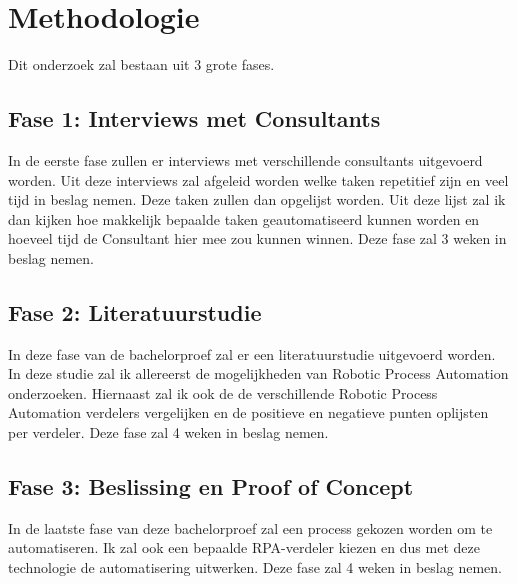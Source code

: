 


\section{Methodologie}%
\label{sec:methodologie}
Dit onderzoek zal bestaan uit 3 grote fases.
\subsection{Fase 1: Interviews met Consultants}
\label{Fase 1: Interviews met Consultants}
In de eerste fase zullen er interviews met verschillende consultants uitgevoerd worden. Uit deze interviews zal afgeleid worden welke taken repetitief zijn en veel tijd in beslag nemen. Deze taken zullen dan opgelijst worden. Uit deze lijst zal ik dan kijken hoe makkelijk bepaalde taken geautomatiseerd kunnen worden en hoeveel tijd de Consultant hier mee zou kunnen winnen.
Deze fase zal 3 weken in beslag nemen.
\subsection{Fase 2: Literatuurstudie}
\label{Fase 2: Literatuurstudie}
In deze fase van de bachelorproef zal er een literatuurstudie uitgevoerd worden. In deze studie zal ik allereerst de mogelijkheden van Robotic Process Automation onderzoeken. Hiernaast zal ik ook de de verschillende Robotic Process Automation verdelers vergelijken en de positieve en negatieve punten oplijsten per verdeler.
Deze fase zal 4 weken in beslag nemen.
\subsection{Fase 3: Beslissing en Proof of Concept}
\label{Fase 3: Beslissing en Proof of Concept}
In de laatste fase van deze bachelorproef zal een process gekozen worden om te automatiseren. Ik zal ook een bepaalde RPA-verdeler kiezen en dus met deze technologie de automatisering uitwerken.
Deze fase zal 4 weken in beslag nemen.

